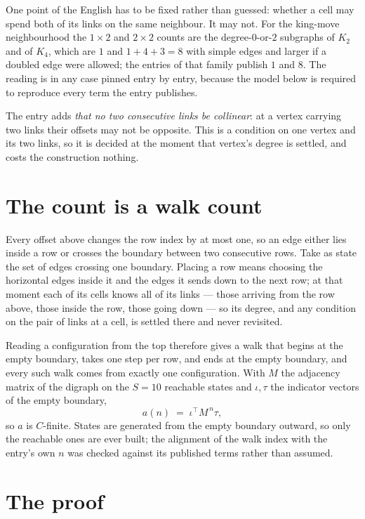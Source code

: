 \documentclass[11pt,a4paper]{article}
\theoremstyle{plain}
\theoremstyle{definition}
\begin{document}
One point of the English has to be fixed rather than guessed: whether a cell may spend both of
its links on the same neighbour. It may not. For the king-move neighbourhood the $1\times2$
and $2\times2$ counts are the degree-$0$-or-$2$ subgraphs of $K_2$ and of $K_4$, which are $1$
and $1+4+3=8$ with simple edges and larger if a doubled edge were allowed; the entries of that
family publish $1$ and $8$. The reading is in any case pinned entry by entry, because the
model below is required to reproduce every term the entry publishes.

The entry adds \emph{that no two consecutive links be collinear}: at a vertex carrying two
links their offsets may not be opposite. This is a condition on one vertex and its two links,
so it is decided at the moment that vertex's degree is settled, and costs the construction
nothing.

\section{The count is a walk count}

Every offset above changes the row index by at most one, so an edge either lies inside a row
or crosses the boundary between two consecutive rows. Take as state the set of edges crossing
one boundary. Placing a row means choosing the horizontal edges inside it and the edges it
sends down to the next row; at that moment each of its cells knows all of its links --- those
arriving from the row above, those inside the row, those going down --- so its degree, and any
condition on the pair of links at a cell, is settled there and never revisited.

Reading a configuration from the top therefore gives a walk that begins at the empty boundary,
takes one step per row, and ends at the empty boundary, and every such walk comes from exactly
one configuration. With $M$ the adjacency matrix of the digraph on the $S=10$ reachable
states and $\iota,\tau$ the indicator vectors of the empty boundary,
\[
a(n)\;=\;\iota^{\!\top}M^{\,n}\tau ,
\]
so $a$ is $C$-finite. States are generated from the empty boundary outward, so only the
reachable ones are ever built; the alignment of the walk index with the entry's own $n$ was
checked against its published terms rather than assumed.

\section{The proof}
\end{document}
